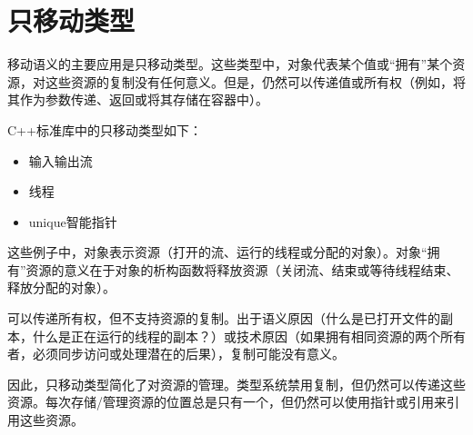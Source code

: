 \chapter{只移动类型}
移动语义的主要应用是只移动类型。这些类型中，对象代表某个值或“拥有”某个资源，对这些资源的复制没有任何意义。但是，仍然可以传递值或所有权（例如，将其作为参数传递、返回或将其存储在容器中）。

C++标准库中的只移动类型如下：

\begin{itemize}
	\item 输入输出流
	\item 线程
	\item unique智能指针
\end{itemize}

这些例子中，对象表示资源（打开的流、运行的线程或分配的对象）。对象“拥有”资源的意义在于对象的析构函数将释放资源（关闭流、结束或等待线程结束、释放分配的对象）。

可以传递所有权，但不支持资源的复制。出于语义原因（什么是已打开文件的副本，什么是正在运行的线程的副本？）或技术原因（如果拥有相同资源的两个所有者，必须同步访问或处理潜在的后果），复制可能没有意义。

因此，只移动类型简化了对资源的管理。类型系统禁用复制，但仍然可以传递这些资源。每次存储/管理资源的位置总是只有一个，但仍然可以使用指针或引用来引用这些资源。


























































